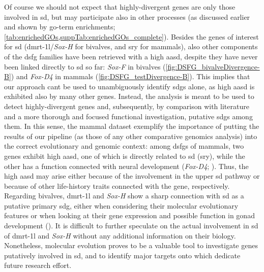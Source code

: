 Of course we should not expect that highly-divergent genes are only those involved in \gls{sd}, but may participate also in other processes (as discussed earlier and shown by \gls{go}-term enrichments; \cref{tab:enrichedGOs,suppTab:enrichedGOs_complete}). Besides the genes of interest for \gls{sd} (\gls{dmrt-1l}/\textit{Sox-H} for bivalves, and \gls{sry} for mammals), also other components of the \gls{dsfg} families have been retrieved with a high \gls{aasd}, despite they have never been linked directly to \gls{sd} so far: \textit{Sox-F} in bivalves (\cref{fig:DSFG_bivalveDivergence-B}) and \textit{Fox-D4} in mammals (\cref{fig:DSFG_testDivergence-B}). This implies that our approach can\curlyapostrophe t be used to unambiguously identify \glspl{sdg} alone, as high \gls{aasd} is exhibited also by many other genes. Instead, the analysis is meant to be used to detect highly-divergent genes and, subsequently, by comparison with literature and a more thorough and focused functional investigation, putative \glspl{sdg} among them. In this sense, the mammal dataset exemplify the importance of putting the results of our pipeline (as those of any other comparative genomics analysis) into the correct evolutionary and genomic context: among \glspl{dsfg} of mammals, two genes exhibit high \gls{aasd}, one of which is directly related to \gls{sd} (\gls{sry}), while the other has a function connected with neural development (\textit{Fox-D4}; ). Thus, the high \gls{aasd} may arise either because of the involvement in the upper \gls{sd} pathway or because of other life-history traits connected with the gene, respectively. Regarding bivalves, \gls{dmrt-1l} and \textit{Sox-H} show a sharp connection with \gls{sd} as a putative primary \gls{sdg}, either when considering their molecular evolutionary features or when looking at their gene expression and possible function in gonad development (). It is difficult to further speculate on the actual involvement in \gls{sd} of \gls{dmrt-1l} and \textit{Sox-H} without any additional information on their biology. Nonetheless, molecular evolution proves to be a valuable tool to investigate genes putatively involved in \gls{sd}, and to identify major targets onto which dedicate future research effort.

